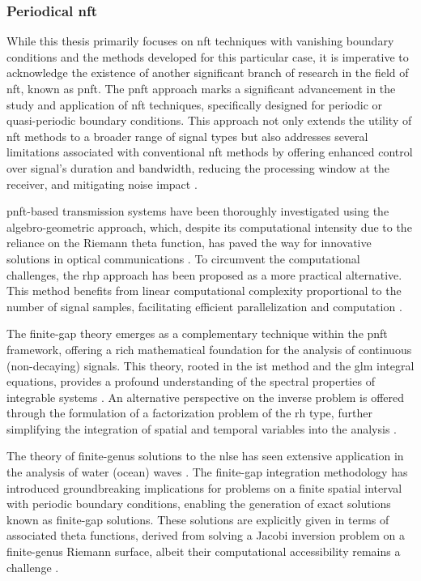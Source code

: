 \subsubsection{Periodical \acrlong{nft}}

While this thesis primarily focuses on \acrlong{nft} techniques with vanishing boundary conditions and the methods developed for this particular case, it is imperative to acknowledge the existence of another significant branch of research in the field of \acrshort{nft}, known as \acrfull{pnft}. The \acrshort{pnft} approach marks a significant advancement in the study and application of \acrshort{nft} techniques, specifically designed for periodic or quasi-periodic boundary conditions. This approach not only extends the utility of \acrshort{nft} methods to a broader range of signal types but also addresses several limitations associated with conventional \acrshort{nft} methods by offering enhanced control over signal's duration and bandwidth, reducing the processing window at the receiver, and mitigating noise impact \cite{kamalian2016periodic}.

\acrshort{pnft}-based transmission systems have been thoroughly investigated using the algebro-geometric approach, which, despite its computational intensity due to the reliance on the Riemann theta function, has paved the way for innovative solutions in optical communications \cite{goossens2020data, goossens2019experimental}. To circumvent the computational challenges, the \acrfull{rhp} approach has been proposed as a more practical alternative. This method benefits from linear computational complexity proportional to the number of signal samples, facilitating efficient parallelization and computation \cite{kamalian2018signal}.

The finite-gap theory emerges as a complementary technique within the \acrshort{pnft} framework, offering a rich mathematical foundation for the analysis of continuous (non-decaying) signals. This theory, rooted in the \acrfull{ist} method and the \acrlong{glm} integral equations, provides a profound understanding of the spectral properties of integrable systems \cite{novikov1984theory}.  An alternative perspective on the inverse problem is offered through the formulation of a factorization problem of the \acrfull{rh} type, further simplifying the integration of spatial and temporal variables into the analysis \cite{trogdon2015riemann}.

The theory of finite-genus solutions to the \acrshort{nlse} has seen extensive application in the analysis of water (ocean) waves \cite{osborne2010nonlinear,osborne2020nonlinear}. The finite-gap integration methodology has introduced groundbreaking implications for problems on a finite spatial interval with periodic boundary conditions, enabling the generation of exact solutions known as finite-gap solutions. These solutions are explicitly given in terms of associated theta functions, derived from solving a Jacobi inversion problem on a finite-genus Riemann surface, albeit their computational accessibility remains a challenge \cite{matveev200830, belokolos1994algebro, kotlyarov2017planar}.

